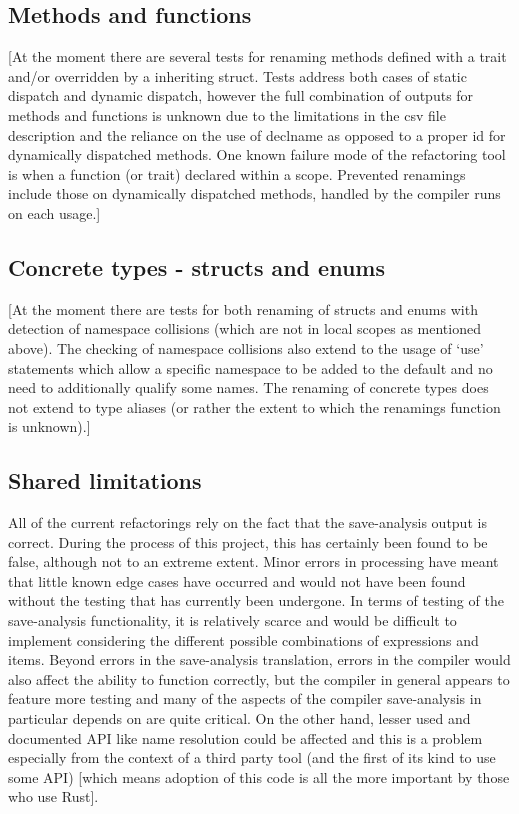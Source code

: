 \subsection{Methods and functions}
[At the moment there are several tests for renaming methods defined with a trait and/or overridden by a inheriting struct. Tests address both cases of static dispatch and dynamic dispatch, however the full combination of outputs for methods and functions is unknown due to the limitations in the csv file description and the reliance on the use of declname as opposed to a proper id for dynamically dispatched methods. One known failure mode of the refactoring tool is when a function (or trait) declared within a scope. Prevented renamings include those on dynamically dispatched methods, handled by the compiler runs on each usage.]

\subsection{Concrete types - structs and enums}
[At the moment there are tests for both renaming of structs and enums with detection of namespace collisions (which are not in local scopes as mentioned above). The checking of namespace collisions also extend to the usage of `use' statements which allow a specific namespace to be added to the default and no need to additionally qualify some names. The renaming of concrete types does not extend to type aliases (or rather the extent to which the renamings function is unknown).]

\subsection{Shared limitations}
All of the current refactorings rely on the fact that the save-analysis output is correct. During the process of this project, this has certainly been found to be false, although not to an extreme extent. Minor errors in processing have meant that little known edge cases have occurred and would not have been found without the testing that has currently been undergone. In terms of testing of the save-analysis functionality, it is relatively scarce and would be difficult to implement considering the different possible combinations of expressions and items. Beyond errors in the save-analysis translation, errors in the compiler would also affect the ability to function correctly, but the compiler in general appears to feature more testing and many of the aspects of the compiler save-analysis in particular depends on are quite critical. On the other hand, lesser used and documented API like name resolution could be affected and this is a problem especially from the context of a third party tool (and the first of its kind to use some API) [which means adoption of this code is all the more important by those who use Rust]. 

